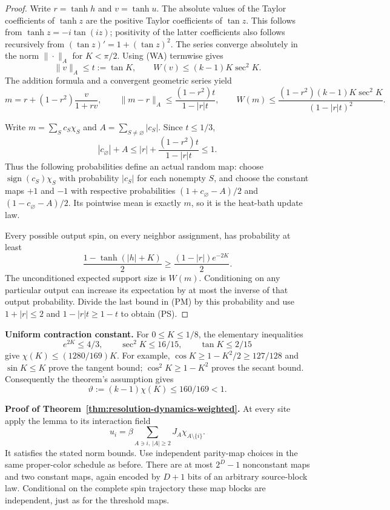 \begin{proof}
Write \(r=\tanh h\) and \(v=\tanh u\). The absolute values of
the Taylor coefficients of \(\tanh z\) are the positive Taylor
coefficients of \(\tan z\). This follows from
\(\tanh z=-i\tan(iz)\); positivity of the latter coefficients also
follows recursively from \((\tan z)'=1+(\tan z)^2\). The series
converge absolutely in the norm \(\|\cdot\|_A\) for \(K<\pi/2\).
Using (WA) termwise gives
\[
 \|v\|_A\le t:=\tan K,
 \qquad W(v)\le(k-1)K\sec^2 K.
\]
The addition formula and a convergent geometric series yield
\[
 m=r+(1-r^2)\frac{v}{1+rv},\qquad
 \|m-r\|_A\le\frac{(1-r^2)t}{1-|r|t},\qquad
 W(m)\le\frac{(1-r^2)(k-1)K\sec^2K}{(1-|r|t)^2}.
 \tag{PM}
\]

Write \(m=\sum_S c_S\chi_S\) and
\(A=\sum_{S\ne\varnothing}|c_S|\). Since \(t\le1/3\),
\[
 |c_\varnothing|+A
 \le |r|+\frac{(1-r^2)t}{1-|r|t}\le1.
\]
Thus the following probabilities define an actual random map:
choose \(\operatorname{sign}(c_S)\chi_S\) with probability
\(|c_S|\) for each nonempty \(S\), and choose the constant maps
\(+1\) and \(-1\) with respective probabilities
\((1+c_\varnothing-A)/2\) and
\((1-c_\varnothing-A)/2\). Its pointwise mean is exactly \(m\),
so it is the heat-bath update law.

Every possible output spin, on every neighbor assignment, has
probability at least
\[
 \frac{1-\tanh(|h|+K)}2
 \ge\frac{(1-|r|)e^{-2K}}2.
\]
The unconditioned expected support size is \(W(m)\). Conditioning
on any particular output can increase its expectation by at most the
inverse of that output probability. Divide the last bound in (PM) by
this probability and use \(1+|r|\le2\) and
\(1-|r|t\ge1-t\) to obtain (PS).
\end{proof}

\textbf{Uniform contraction constant.}
For \(0\le K\le1/8\), the elementary inequalities
\[
 e^{2K}\le4/3,\qquad \sec^2K\le16/15,
 \qquad\tan K\le2/15
\]
give \(\chi(K)\le(1280/169)K\). For example,
\(\cos K\ge1-K^2/2\ge127/128\) and \(\sin K\le K\)
prove the tangent bound; \(\cos^2K\ge1-K^2\) proves the secant
bound. Consequently the theorem's assumption gives
\[
 \vartheta:=(k-1)\chi(K)\le160/169<1.
 \tag{PC}
\]

\textbf{Proof of Theorem~\ref{thm:resolution-dynamics-weighted}.}
At every site apply the lemma to its interaction field
\[
 u_i=\beta\sum_{A\ni i,\,|A|\ge2}J_A\chi_{A\setminus\{i\}}.
\]
It satisfies the stated norm bounds. Use independent parity-map
choices in the same proper-color schedule as before. There are at
most \(2^D-1\) nonconstant maps and two constant maps, again encoded
by \(D+1\) bits of an arbitrary source-block law. Conditional on the
complete spin trajectory these map blocks are independent, just as
for the threshold maps.

